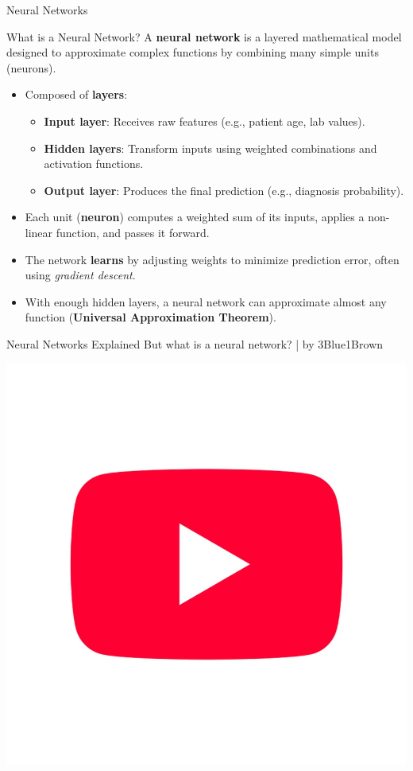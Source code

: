 \documentclass[aspectratio=169,xcolor=dvipsnames]{beamer}
\begin{document}
\begin{frame}{Neural Networks}
  \begin{block}{What is a Neural Network?}
    A \textbf{neural network} is a layered mathematical model designed to approximate complex functions by combining many simple units (neurons).
  \end{block}

  \vspace{0.5em}

  \begin{itemize}
    \item Composed of \textbf{layers}:
      \begin{itemize}
        \item \textbf{Input layer}: Receives raw features (e.g., patient age, lab values).
        \item \textbf{Hidden layers}: Transform inputs using weighted combinations and activation functions.
        \item \textbf{Output layer}: Produces the final prediction (e.g., diagnosis probability).
      \end{itemize}
    \item Each unit (\textbf{neuron}) computes a weighted sum of its inputs, applies a non-linear function, and passes it forward.
    \item The network \textbf{learns} by adjusting weights to minimize prediction error, often using \textit{gradient descent}.
    \item With enough hidden layers, a neural network can approximate almost any function (\textbf{Universal Approximation Theorem}).
  \end{itemize}
\end{frame}

\begin{frame}{Neural Networks Explained}
\centering
But what is a neural network? | by 3Blue1Brown
	\begin{center}
    \href{https://www.youtube.com/watch?v=aircAruvnKk}{%
      \includegraphics[width=0.5\linewidth]{images/utube.jpg}%
    }
  \end{center}
  
\end{frame}
\end{document}
